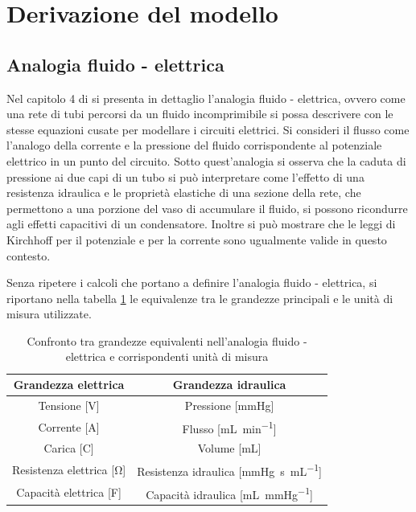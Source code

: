 \documentclass{article}
\begin{document}
\section{Derivazione del modello}
\subsection{Analogia fluido - elettrica}
Nel capitolo 4 di \cite{notes} si presenta in dettaglio l'analogia fluido - elettrica, ovvero come una rete di tubi percorsi da un fluido incomprimibile si possa descrivere con le stesse equazioni cusate per modellare i circuiti elettrici.
Si consideri il flusso come l'analogo della corrente e la pressione del fluido corrispondente al potenziale elettrico in un punto del circuito.
Sotto quest'analogia si osserva che la caduta di pressione ai due capi di un tubo si può interpretare come l'effetto di una resistenza idraulica e le proprietà elastiche di una sezione della rete, che permettono a una porzione del vaso di accumulare il fluido, si possono ricondurre agli effetti capacitivi di un condensatore.
Inoltre si può mostrare che le leggi di Kirchhoff per il potenziale e per la corrente sono ugualmente valide in questo contesto.

Senza ripetere i calcoli che portano a definire l'analogia fluido - elettrica, si riportano nella tabella \ref{tab_analogia} le equivalenze tra le grandezze principali e le unità di misura utilizzate.

\begin{table}[h!]
\begin{center}
\begin{tabular}{| c | c |}
\hline
\textbf{Grandezza elettrica} & \textbf{Grandezza idraulica}\\
\hline
Tensione [\si{\volt}] & Pressione [\si{\mmHg}]\\
Corrente [\si{\ampere}] & Flusso [\si{\milli\liter \per \minute}]\\
Carica [\si{\coulomb}] & Volume [\si{\milli\liter}]\\
Resistenza elettrica [\si{\ohm}] & Resistenza idraulica [\si{\mmHg \second \per \milli\liter}]\\
Capacità elettrica [\si{\farad}] & Capacità idraulica [\si{\milli\liter \per \mmHg}]\\
\hline
\end{tabular}
\caption{Confronto tra grandezze equivalenti nell'analogia fluido - elettrica e corrispondenti unità di misura}
\label{tab_analogia}
\end{center}
\end{table}
\end{document}
